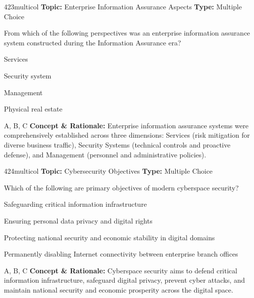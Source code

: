\begin{qcard}{423}{multicol}
\textcolor{darkslate!75}{\small\textbf{Topic:} Enterprise Information Assurance Aspects \hfill \textbf{Type:} Multiple Choice}\vspace{0.4em}\par
From which of the following perspectives was an enterprise information assurance system constructed during the Information Assurance era?
\begin{qoptions}
\item Services
\item Security system
\item Management
\item Physical real estate
\end{qoptions}
\end{qcard}
\nopagebreak
\begin{explainbox}{A, B, C}
\textbf{Concept \& Rationale:} Enterprise information assurance systems were comprehensively established across three dimensions: Services (risk mitigation for diverse business traffic), Security Systems (technical controls and proactive defense), and Management (personnel and administrative policies).
\end{explainbox}

\begin{qcard}{424}{multicol}
\textcolor{darkslate!75}{\small\textbf{Topic:} Cybersecurity Objectives \hfill \textbf{Type:} Multiple Choice}\vspace{0.4em}\par
Which of the following are primary objectives of modern cyberspace security?
\begin{qoptions}
\item Safeguarding critical information infrastructure
\item Ensuring personal data privacy and digital rights
\item Protecting national security and economic stability in digital domains
\item Permanently disabling Internet connectivity between enterprise branch offices
\end{qoptions}
\end{qcard}
\nopagebreak
\begin{explainbox}{A, B, C}
\textbf{Concept \& Rationale:} Cyberspace security aims to defend critical information infrastructure, safeguard digital privacy, prevent cyber attacks, and maintain national security and economic prosperity across the digital space.
\end{explainbox}

